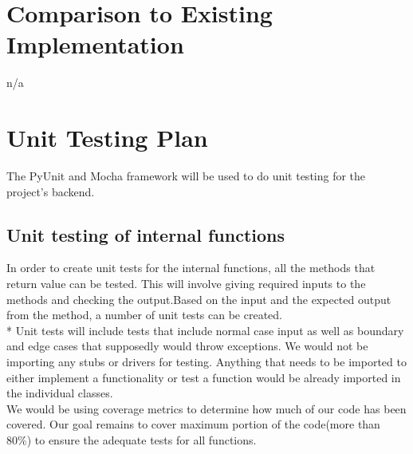\documentclass[12pt, titlepage]{article}
\begin{document}
	
\section{Comparison to Existing Implementation}	
n/a
				
\section{Unit Testing Plan}
The PyUnit and Mocha framework will be used to do unit testing for the project's backend.
		
\subsection{Unit testing of internal functions}
In order to create unit tests for the internal functions, all the methods that return value can be tested. This will involve giving required inputs to the methods and checking the output.Based on the input and the expected output from the method, a number of unit tests can be created. \\*
Unit tests will include tests that include normal case input as well as boundary and edge cases that supposedly would throw exceptions. We would not be importing any stubs or drivers for testing. Anything that needs to be imported to either implement a functionality or test a function would be already imported in the individual classes. \\
We would be using coverage metrics to determine how much of our code has been covered. Our goal remains to cover maximum portion of the code(more than 80\%) to ensure the adequate tests for all functions.

\end{document}
